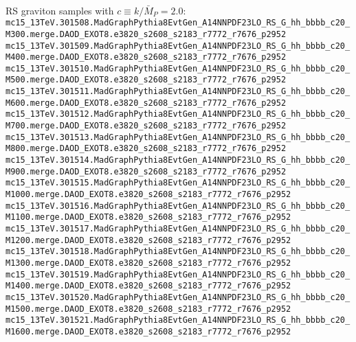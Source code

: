 \paragraph{} RS graviton samples with $c \equiv k/\bar{M}_P = 2.0$:
\noindent
\\
{\tiny
\verb|mc15_13TeV.301508.MadGraphPythia8EvtGen_A14NNPDF23LO_RS_G_hh_bbbb_c20_M300.merge.DAOD_EXOT8.e3820_s2608_s2183_r7772_r7676_p2952|\\
\verb|mc15_13TeV.301509.MadGraphPythia8EvtGen_A14NNPDF23LO_RS_G_hh_bbbb_c20_M400.merge.DAOD_EXOT8.e3820_s2608_s2183_r7772_r7676_p2952|\\
\verb|mc15_13TeV.301510.MadGraphPythia8EvtGen_A14NNPDF23LO_RS_G_hh_bbbb_c20_M500.merge.DAOD_EXOT8.e3820_s2608_s2183_r7772_r7676_p2952|\\
\verb|mc15_13TeV.301511.MadGraphPythia8EvtGen_A14NNPDF23LO_RS_G_hh_bbbb_c20_M600.merge.DAOD_EXOT8.e3820_s2608_s2183_r7772_r7676_p2952|\\
\verb|mc15_13TeV.301512.MadGraphPythia8EvtGen_A14NNPDF23LO_RS_G_hh_bbbb_c20_M700.merge.DAOD_EXOT8.e3820_s2608_s2183_r7772_r7676_p2952|\\
\verb|mc15_13TeV.301513.MadGraphPythia8EvtGen_A14NNPDF23LO_RS_G_hh_bbbb_c20_M800.merge.DAOD_EXOT8.e3820_s2608_s2183_r7772_r7676_p2952|\\
\verb|mc15_13TeV.301514.MadGraphPythia8EvtGen_A14NNPDF23LO_RS_G_hh_bbbb_c20_M900.merge.DAOD_EXOT8.e3820_s2608_s2183_r7772_r7676_p2952|\\
\verb|mc15_13TeV.301515.MadGraphPythia8EvtGen_A14NNPDF23LO_RS_G_hh_bbbb_c20_M1000.merge.DAOD_EXOT8.e3820_s2608_s2183_r7772_r7676_p2952|\\
\verb|mc15_13TeV.301516.MadGraphPythia8EvtGen_A14NNPDF23LO_RS_G_hh_bbbb_c20_M1100.merge.DAOD_EXOT8.e3820_s2608_s2183_r7772_r7676_p2952|\\
\verb|mc15_13TeV.301517.MadGraphPythia8EvtGen_A14NNPDF23LO_RS_G_hh_bbbb_c20_M1200.merge.DAOD_EXOT8.e3820_s2608_s2183_r7772_r7676_p2952|\\
\verb|mc15_13TeV.301518.MadGraphPythia8EvtGen_A14NNPDF23LO_RS_G_hh_bbbb_c20_M1300.merge.DAOD_EXOT8.e3820_s2608_s2183_r7772_r7676_p2952|\\
\verb|mc15_13TeV.301519.MadGraphPythia8EvtGen_A14NNPDF23LO_RS_G_hh_bbbb_c20_M1400.merge.DAOD_EXOT8.e3820_s2608_s2183_r7772_r7676_p2952|\\
\verb|mc15_13TeV.301520.MadGraphPythia8EvtGen_A14NNPDF23LO_RS_G_hh_bbbb_c20_M1500.merge.DAOD_EXOT8.e3820_s2608_s2183_r7772_r7676_p2952|\\
\verb|mc15_13TeV.301521.MadGraphPythia8EvtGen_A14NNPDF23LO_RS_G_hh_bbbb_c20_M1600.merge.DAOD_EXOT8.e3820_s2608_s2183_r7772_r7676_p2952|\\
}
